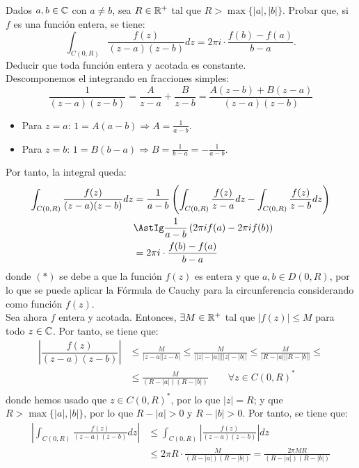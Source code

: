 \begin{ejercicio}
    Dados $a,b \in \mathbb{C}$ con $a \neq b$, sea $R \in \mathbb{R}^+$ tal que $R > \max\{|a|,|b|\}$. Probar que, si $f$ es una función entera, se tiene:
    \[
        \int_{C(0,R)} \frac{f(z)}{(z-a)(z-b)}dz = 2\pi i \cdot \frac{f(b)-f(a)}{b-a}.
    \]
    Deducir que toda función entera y acotada es constante.\\

    Descomponemos el integrando en fracciones simples:
    \begin{equation*}
        \frac{1}{(z-a)(z-b)} = \frac{A}{z-a} + \frac{B}{z-b} = \frac{A(z-b)+B(z-a)}{(z-a)(z-b)}
    \end{equation*}
    \begin{itemize}
        \item Para $z=a$: $1=A(a-b)\Longrightarrow A=\frac{1}{a-b}$.
        \item Para $z=b$: $1=B(b-a)\Longrightarrow B=\frac{1}{b-a}=-\frac{1}{a-b}$.
    \end{itemize}

    Por tanto, la integral queda:
    \begin{align*}
        \int_{C(0,R)} \frac{f(z)}{(z-a)(z-b)}dz &= \frac{1}{a-b}\left(\int_{C(0,R)} \frac{f(z)}{z-a}dz - \int_{C(0,R)} \frac{f(z)}{z-b}dz\right)\\
        &\AstIg \frac{1}{a-b}\left(2\pi i f(a) - 2\pi i f(b)\right)\\
        &= 2\pi i \cdot \frac{f(b)-f(a)}{b-a}
    \end{align*}
    donde $(\ast)$ se debe a que la función $f(z)$ es entera y que $a,b\in D(0,R)$, por lo que se puede aplicar la Fórmula de Cauchy para la circunferencia considerando como función $f(z)$.\\

    Sea ahora $f$ entera y acotada. Entonces, $\exists M\in \mathbb{R}^+$ tal que $|f(z)|\leq M$ para todo $z\in \mathbb{C}$. Por tanto, se tiene que:
    \begin{align*}
        \left|\dfrac{f(z)}{(z-a)(z-b)}\right| &\leq \frac{M}{|z-a||z-b|}
        \leq \frac{M}{\left||z| - |a|\right|\left||z| - |b|\right|}
        \leq \frac{M}{\left|R - |a|\right|\left|R - |b|\right|}
        \leq\\&\leq  \frac{M}{(R-|a|)(R-|b|)}\qquad \forall z\in C(0,R)^*\\
    \end{align*}
    donde hemos usado que $z\in C(0,R)^*$, por lo que $|z|=R$; y que $R>\max\{|a|,|b|\}$, por lo que $R-|a|>0$ y $R-|b|>0$. Por tanto, se tiene que:
    \begin{align*}
        \left|\int_{C(0,R)} \frac{f(z)}{(z-a)(z-b)}dz\right| &\leq \int_{C(0,R)} \left|\frac{f(z)}{(z-a)(z-b)}\right|dz\\
        &\leq 2\pi R \cdot \frac{M}{(R-|a|)(R-|b|)} = \frac{2\pi M R}{(R-|a|)(R-|b|)}
    \end{align*}


\end{ejercicio}
